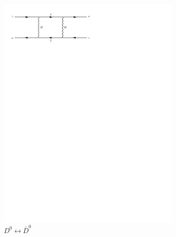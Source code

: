 \begin{figure}[h]
  \centering
  \begin{subfigure}[b]{0.3\textwidth}
    \includegraphics[trim={0.5cm 22cm 10cm 0cm},width=\textwidth]{../Diagrams/D19.pdf}
    \caption{$D^0\longleftrightarrow \bar{D}^0$}
    \label{fey:19}
  \end{subfigure}
  ~
  \begin{subfigure}[b]{0.3\textwidth}

\end{subfigure}
\end{figure}
